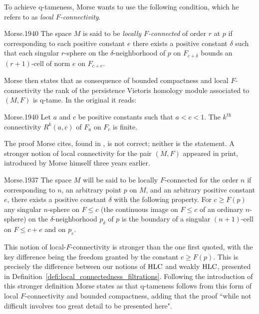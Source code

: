 To achieve q-tameness, Morse wants to use the following condition, which he refers to as \textit{local $F$-connectivity}.
\begin{displaycquote}[p.431]{Morse.1940}
	The space $M$ is said to be \textit{locally $F$-connected} of order $r$ at $p$ if corresponding to each positive constant $e$ there exists a positive constant $\delta$ such that each singular $r$-sphere on the $\delta$-neighborhood of $p$ on $F_{c+\delta}$ bounds an $(r+1)$-cell of norm $e$ on $F_{c+e}$.
\end{displaycquote}
Morse then states that as consequence of bounded compactness and local $F$-connectivity the rank of the persistence Vietoris homology module associated to $(M, F)$ is q-tame.
In the original it reads:
\begin{displaycquote}[Theorem 6.3, p.432]{Morse.1940}
	Let $a$ and $c$ be positive constants such that $a < c < 1$.
	The $k^{\mathrm{th}}$ connectivity $R^k(a,c)$ of $F_a$ on $F_c$ is finite.
\end{displaycquote}
The proof Morse cites, found in \cite[Theorem 6.1]{Morse.1938}, is not correct; neither is the statement.
A stronger notion of local connectivity for the pair $(M, F)$ appeared in print, introduced by Morse himself three years earlier.
\begin{displaycquote}[p.421-422]{Morse.1937}
	The space $M$ will be said to be locally $F$-connected for the order $n$ if corresponding to $n$, an arbitrary point $p$ on $M$, and an arbitrary positive constant $e$, there exists a positive constant $\delta$ with the following property. For $c \geq F(p)$ any singular $n$-sphere on $F \leq c$ (the continuous image on $F \leq c$ of an ordinary $n$-sphere) on the $\delta$-neighborhood $p_{\delta}$ of $p$ is the boundary of a singular $(n + 1)$-cell on $F \leq c + e$ and on $p_e$.
\end{displaycquote}
This notion of local-$F$-connectivity is stronger than the one first quoted, with the key difference being the freedom granted by the constant $c \geq F(p)$.
This is precisely the difference between our notions of $\mathrm{HLC}$ and weakly $\mathrm{HLC}$, presented in Definition~\ref{defi:local_connectedness_filtrations}.
Following the introduction of this stronger definition Morse states as \cite[Theorem~9.2, p.422]{Morse.1937} that q-tameness follows from this form of local $F$-connectivity and bounded compactness, adding that the proof ``while not difficult involves too great detail to be presented here".


